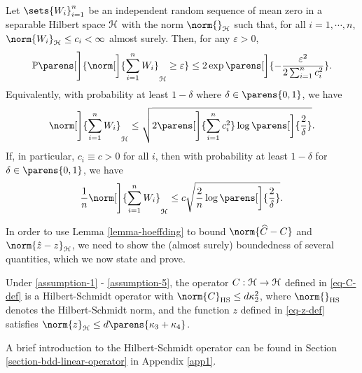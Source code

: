 \begin{lemma}\label{lemma-hoeffding}
	Let $\sets{W_i}_{i=1}^n$ be an independent random sequence of mean zero in a separable Hilbert space $\mathcal{H}$ with the norm $\norm{}_{\calH}$ such that, for all $i = 1, \cdots, n$, $\norm{W_i}_{\calH} \le c_i < \infty$ almost surely. Then, for any $\varepsilon > 0$, 
	\begin{align*}
		\Pr \parens[\Bigg]{\norm[\bigg]{\sum_{i=1}^n W_i}_{\calH} \ge \varepsilon} \le 2 \exp \parens[\bigg]{- \frac{\varepsilon^2}{2 \sum_{i=1}^n c_i^2}}. 
	\end{align*}
	Equivalently, with probability at least $1 - \delta$ where $\delta \in \parens{0, 1}$, we have 
	\begin{align*}
		\norm[\Bigg]{\sum_{i=1}^n W_i}_{\hil} \le \sqrt{2 \parens[\Bigg]{\sum_{i=1}^n c_i^2} \log \parens[\bigg]{\frac{2}{\delta}}}. 
	\end{align*}
	If, in particular, $c_i \equiv c > 0$ for all $i$, then with probability at least $1 - \delta$ for $\delta \in \parens{0, 1}$, we have 
	\begin{align*}
		\frac{1}{n} \norm[\Bigg]{\sum_{i=1}^n W_i}_{\calH} \le c \sqrt{\frac{2}{n} \log \parens[\bigg]{\frac{2}{\delta}}}. 
	\end{align*}
\end{lemma}

In order to use Lemma \ref{lemma-hoeffding} to bound $\norm{\widehat{C} - C}$ and $\norm{\hat{z} - z}_{\calH}$, we need to show the (almost surely) boundedness of several quantities, which we now state and prove. 

\begin{lemma}\label{lemma-population-C-z-bounds}
	Under \ref{assumption-1} - \ref{assumption-5}, the operator $C: \mathcal{H} \to \mathcal{H}$ defined in \eqref{eq-C-def} is a Hilbert-Schmidt operator with $\norm{C}_{\mathrm{HS}} \le d \kappa_2^2$, where $\norm{}_{\mathrm{HS}}$ denotes the Hilbert-Schmidt norm, and the function $z$ defined in \eqref{eq-z-def} satisfies $\norm{z}_{\calH} \le d \parens{\kappa_3 + \kappa_4}$. 
\end{lemma}

A brief introduction to the Hilbert-Schmidt operator can be found in Section \ref{section-bdd-linear-operator} in Appendix \ref{app1}. 

